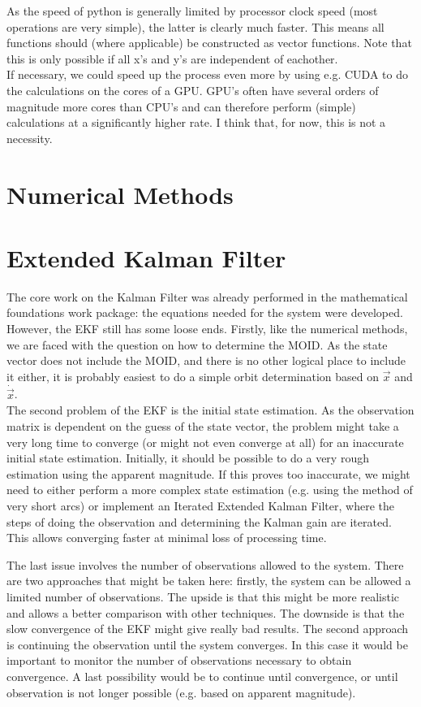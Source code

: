 \documentclass[a4paper,10pt]{article}
\begin{document}
As the speed of python is generally limited by processor clock speed (most operations are very simple), the latter is clearly much faster. This means all functions should (where applicable) be constructed as vector functions. Note that this is only possible if all x's and y's are independent of eachother. \\

If necessary, we could speed up the process even more by using e.g. CUDA to do the calculations on the cores of a GPU. GPU's often have several orders of magnitude more cores than CPU's and can therefore perform (simple) calculations at a significantly higher rate. I think that, for now, this is not a necessity.

\section{Numerical Methods}

\section{Extended Kalman Filter}

The core work on the Kalman Filter was already performed in the mathematical foundations work package: the equations needed for the system were developed. However, the EKF still has some loose ends. Firstly, like the numerical methods, we are faced with the question on how to determine the MOID. As the state vector does not include the MOID, and there is no other logical place to include it either, it is probably easiest to do a simple orbit determination based on $\vec{x}$ and $\dot{\vec{x}}$. \\

The second problem of the EKF is the initial state estimation. As the observation matrix is dependent on the guess of the state vector, the problem might take a very long time to converge (or might not even converge at all) for an inaccurate initial state estimation. Initially, it should be possible to do a very rough estimation using the apparent magnitude. If this proves too inaccurate, we might need to either perform a more complex state estimation (e.g. using the method of very short arcs) or implement an Iterated Extended Kalman Filter, where the steps of doing the observation and determining the Kalman gain are iterated. This allows converging faster at minimal loss of processing time.

The last issue involves the number of observations allowed to the system. There are two approaches that might be taken here: firstly, the system can be allowed a limited number of observations. The upside is that this might be more realistic and allows a better comparison with other techniques. The downside is that the slow convergence of the EKF might give really bad results. The second approach is continuing the observation until the system converges. In this case it would be important to monitor the number of observations necessary to obtain convergence. A last possibility would be to continue until convergence, or until observation is not longer possible (e.g. based on apparent magnitude). 
\end{document}
